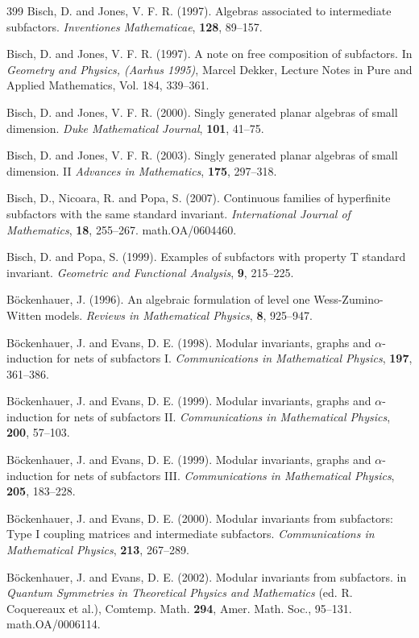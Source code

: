 \documentclass[12pt]{article}
\theoremstyle{plain}
\theoremstyle{definition}
\numberwithin{equation}{section}
\begin{document}
\begin{thebibliography} {399}
Bisch, D. and Jones, V. F. R. (1997).
Algebras associated to intermediate subfactors.
{\em Inventiones Mathematicae},
{\bf 128}, 89--157.

Bisch, D. and Jones, V. F. R. (1997).
A note on free composition of subfactors.
In {\em Geometry and Physics, (Aarhus 1995)},
Marcel Dekker, Lecture Notes in Pure
and Applied Mathematics, Vol. 184, 339--361.

Bisch, D. and Jones, V. F. R. (2000).
Singly generated planar algebras of small dimension.
{\em Duke Mathematical Journal}, {\bf 101}, 41--75.

Bisch, D. and Jones, V. F. R. (2003).
Singly generated planar algebras of small dimension. II   
{\em Advances in Mathematics}, {\bf 175}, 297--318.

Bisch, D., Nicoara, R. and Popa, S. (2007).
Continuous families of hyperfinite subfactors with 
the same standard invariant.
{\em International Journal of Mathematics}, {\bf 18}, 255--267.
math.OA/0604460.

Bisch, D. and Popa, S. (1999).
Examples of subfactors with property T standard invariant.
{\em Geometric and Functional Analysis}, {\bf 9}, 215--225.

B\"ockenhauer, J. (1996).
An algebraic formulation of level one Wess-Zumino-Witten models.
{\em Reviews in Mathematical Physics}, {\bf 8}, 925--947.

B\"ockenhauer, J. and Evans, D. E. (1998).
Modular invariants, graphs and $\alpha$-induction for
nets of subfactors I.
{\em Communications in Mathematical Physics}, {\bf 197}, 361--386.

B\"ockenhauer, J. and Evans, D. E. (1999).
Modular invariants, graphs and $\alpha$-induction for
nets of subfactors II.
{\em Communications in Mathematical Physics}, {\bf 200}, 57--103.

B\"ockenhauer, J. and Evans, D. E. (1999).
Modular invariants, graphs and $\alpha$-induction for
nets of subfactors III.
{\em Communications in Mathematical Physics}, {\bf 205}, 183--228.

B\"ockenhauer, J. and Evans, D. E. (2000).
Modular invariants from subfactors: Type I coupling matrices and
intermediate subfactors.
{\em Communications in Mathematical Physics}, {\bf 213}, 267--289.

B\"ockenhauer, J. and Evans, D. E. (2002).
Modular invariants from subfactors.
in {\em Quantum Symmetries in Theoretical Physics and Mathematics}
(ed. R. Coquereaux et al.),
Comtemp. Math. {\bf 294}, Amer. Math. Soc., 95--131.
math.OA/0006114.


\end{thebibliography}
\end{document}
